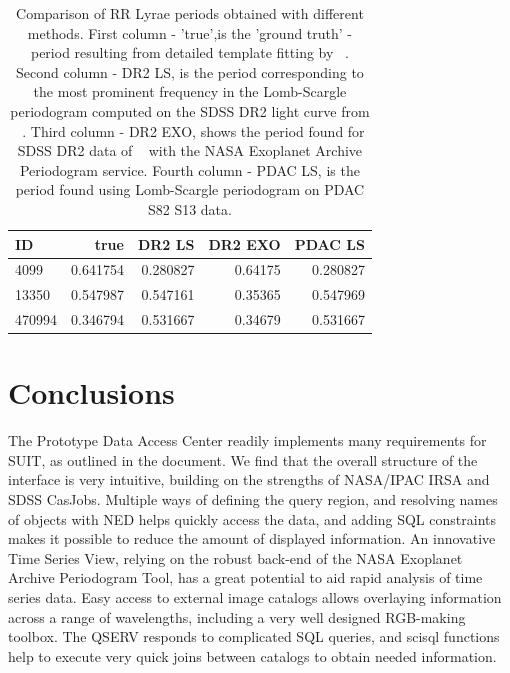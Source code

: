 \documentclass[DM,lsstdraft,toc]{lsstdoc}
\begin{document}
\begin{table}
\centering
\caption{Comparison of RR Lyrae periods obtained with different methods. First column - 'true',is the 'ground truth' -  period resulting from detailed template fitting by ~\citep{2010ApJ...708..717S}. Second column - DR2 LS, is the period corresponding to the most prominent frequency in the Lomb-Scargle periodogram  computed on the SDSS DR2 light curve from ~\citep{2010ApJ...708..717S}. Third column - DR2 EXO, shows the period found for SDSS DR2 data of  ~\citep{2010ApJ...708..717S}  with the NASA Exoplanet Archive Periodogram service.  Fourth column - PDAC LS, is the period found using Lomb-Scargle periodogram  on PDAC S82 S13 data.}
\label{tab:periods}
\begin{tabular}{ l|rrrr }
\hline
 ID      & true        & DR2 LS      & DR2 EXO      &  PDAC LS  \\
\hline
 4099    & 0.641754     & 0.280827   & 0.64175      &  0.280827 \\
 13350   & 0.547987     & 0.547161   & 0.35365      &  0.547969  \\
 470994  & 0.346794     & 0.531667   & 0.34679      &  0.531667  \\
\end{tabular}
\end{table}







\section{Conclusions}

The Prototype Data Access Center readily implements  many requirements for SUIT, as outlined in the  document. We find that the overall structure of the interface is very intuitive, building on the strengths of NASA/IPAC IRSA and SDSS CasJobs. Multiple ways of defining the query region, and resolving names of objects with NED helps quickly access the data, and adding SQL constraints makes it possible to reduce the amount of displayed information.  An innovative Time Series View,  relying on the robust back-end of the NASA Exoplanet Archive Periodogram Tool,  has a great potential to aid rapid analysis of time series data.  Easy access to external image catalogs allows overlaying information across a range of wavelengths, including a very well designed RGB-making  toolbox. The QSERV responds to complicated SQL queries, and scisql functions help to execute very quick joins between catalogs to obtain needed information.
\end{document}
